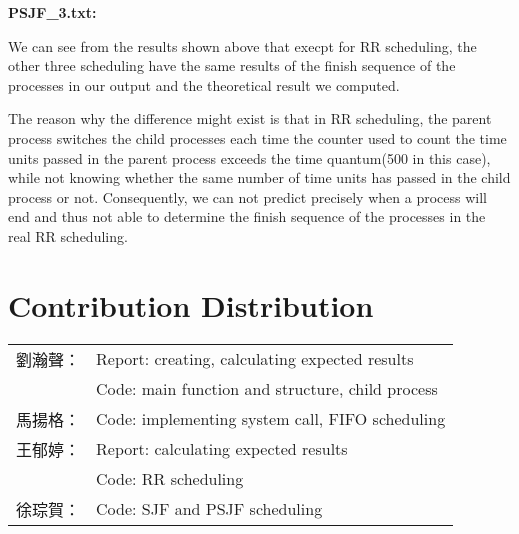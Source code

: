 \documentclass{article}
\begin{document}
        {\noindent\bfseries PSJF\_3.txt:}
        \begin{parcolumns}[nofirstindent, colwidths={1=.2\linewidth}, rulebetween=true]{2}
        \end{parcolumns}
        \rmfamily

        We can see from the results shown above that execpt for RR scheduling, the other three scheduling have the same results of the finish sequence of the processes in our output and the theoretical result we computed.

        The reason why the difference might exist is that in RR scheduling, the parent process switches the child processes each time the counter used to count the time units passed in the parent process exceeds the time quantum(500 in this case), while not knowing whether the same number of time units has passed in the child process or not.  Consequently, we can not predict precisely when a process will end and thus not able to determine the finish sequence of the processes in the real RR scheduling.

\section{Contribution Distribution}
    \begin{table}[H]
    \large
    \begin{tabular}{ll}
    劉瀚聲：&Report: creating, calculating expected results\\
    　　　　&Code: main function and structure, child process\\
    馬揚格：&Code: implementing system call, FIFO scheduling\\
    王郁婷：&Report: calculating expected results\\
    　　　　&Code: RR scheduling\\
    徐琮賀：&Code: SJF and PSJF scheduling\\
    \end{tabular}
    \end{table}
\end{document}
